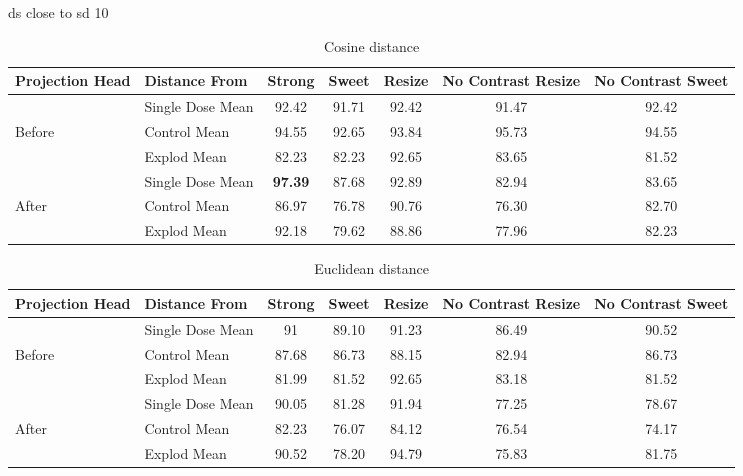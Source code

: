 ds close to sd 10

\begin{table}[H]
  \centering
  \begin{tabular}{@{}llccccc@{}}
  \toprule
  Projection Head & Distance From      & Strong & Sweet & Resize & No Contrast Resize & No Contrast Sweet \\ \midrule
                  & Single Dose Mean   & 92.42      & 91.71     & 92.42      & 91.47                  & 92.42                 \\
  Before          & Control Mean       & 94.55      & 92.65     & 93.84      & 95.73                   & 94.55                 \\
                  & Explod Mean        & 82.23      & 82.23     & 92.65     & 83.65                  & 81.52                \\ \midrule
                  & Single Dose Mean   & \textbf{97.39}  & 87.68     & 92.89     & 82.94                  & 83.65                 \\
  After           & Control Mean       & 86.97      & 76.78    & 90.76      & 76.30                 & 82.70                 \\
                  & Explod Mean        & 92.18      & 79.62    & 88.86      & 77.96                  & 82.23                 \\ \bottomrule
  \end{tabular}
  \caption{Cosine distance}
  \label{tab:your_table_label}
\end{table}


\begin{table}[H]
  \centering
  \begin{tabular}{@{}llccccc@{}}
  \toprule
  Projection Head & Distance From      & Strong & Sweet & Resize & No Contrast Resize & No Contrast Sweet \\ \midrule
                  & Single Dose Mean   & 91      & 89.10     & 91.23      & 86.49                  & 90.52                 \\
  Before          & Control Mean       & 87.68      & 86.73     & 88.15      & 82.94                  & 86.73                 \\
                  & Explod Mean        & 81.99      & 81.52     & 92.65      & 83.18                  &   81.52               \\ \midrule
                  & Single Dose Mean   & 90.05      & 81.28     & 91.94      & 77.25                  & 78.67                 \\
  After           & Control Mean       & 82.23      & 76.07     & 84.12      & 76.54                  & 74.17                 \\
                  & Explod Mean        & 90.52      & 78.20    & 94.79      & 75.83                  & 81.75                 \\ \bottomrule
  \end{tabular}
  \caption{Euclidean distance}
  \label{tab:your_table}
\end{table}


